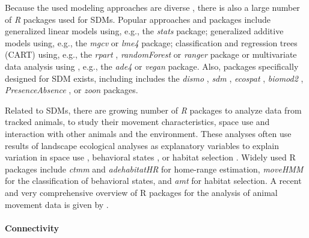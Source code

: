 \documentclass[smallextended]{svjour3}       %
\begin{document}
Because the used modeling approaches are diverse \cite{Hooten2011,Kerr2011,Fletcher2019}, there is also a large number of \emph{R} packages used for SDMs.
Popular approaches and packages include generalized linear models using, e.g., the \emph{stats} \cite{RCoreTeam2019} package; generalized additive models using, e.g., the \emph{mgcv} \cite{Wood2017} or \emph{lme4} \cite{Bates2015} package; classification and regression trees (CART) using, e.g., the \emph{rpart} \cite{Therneau2019}, \emph{randomForest} \cite{Liaw2002} or \emph{ranger} \cite{Wright2017} package or multivariate data analysis using , e.g., the \emph{ade4} \cite{Dray2007} or \emph{vegan} \cite{Oksanen2019} package.
Also, packages specifically designed for SDM exists, including includes the \emph{dismo} \cite{Hijmans2017}, \emph{sdm} \cite{Naimi2016}, \emph{ecospat} \cite{Broennimann2020}, \emph{biomod2} \cite{Thuiller2020}, \emph{PresenceAbsence} \cite{Freeman2008}, or \emph{zoon} \cite{Golding2018} packages.

Related to SDMs, there are growing number of \emph{R} packages to analyze data from tracked animals, to study their movement characteristics, space use and interaction with other animals and the environment.
These analyses often use results of landscape ecological analyses as explanatory variables to explain variation in space use \cite{signer2015}, behavioral states \cite{langrock2012}, or habitat selection \cite{fieberg2020}.
Widely used R packages include \emph{ctmm} \cite{calabrese2016} and \emph{adehabitatHR} \cite{Calenge2006} for home-range estimation, \emph{moveHMM} \cite{michelot2016} for the classification of behavioral states, and \emph{amt} \cite{Signer2019} for habitat selection.
A recent and very comprehensive overview of R packages for the analysis of animal movement data is given by \cite{joo2020}.

\hypertarget{sec:connectivity}{%
\paragraph{Connectivity}\label{sec:connectivity}}
\end{document}
